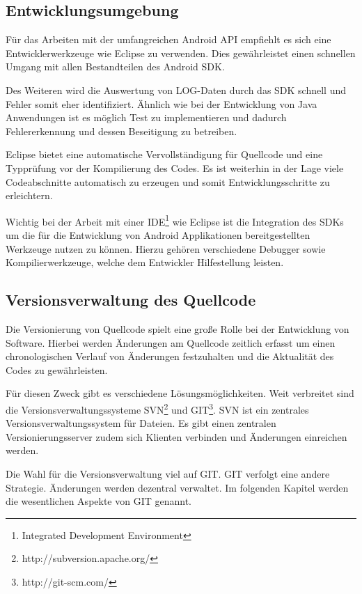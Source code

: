 \subsection{Entwicklungsumgebung}

Für das Arbeiten mit der umfangreichen Android API empfiehlt es sich eine Entwicklerwerkzeuge wie Eclipse zu verwenden. Dies gewährleistet einen schnellen Umgang mit allen Bestandteilen des Android SDK.

Des Weiteren wird die Auswertung von LOG-Daten durch das SDK schnell und Fehler somit eher identifiziert. Ähnlich wie bei der Entwicklung von Java Anwendungen ist es möglich Test zu implementieren und dadurch Fehlererkennung und dessen Beseitigung zu betreiben.

Eclipse bietet eine automatische Vervollständigung für Quellcode und eine Typprüfung vor der Kompilierung des Codes. Es ist weiterhin in der Lage viele Codeabschnitte automatisch zu erzeugen und somit Entwicklungsschritte zu erleichtern.

Wichtig bei der Arbeit mit einer IDE\footnote{Integrated Development Environment} wie Eclipse ist die Integration des SDKs um die für die Entwicklung von Android Applikationen bereitgestellten Werkzeuge nutzen zu können. Hierzu gehören verschiedene Debugger sowie Kompilierwerkzeuge, welche dem Entwickler Hilfestellung leisten.

\subsection{Versionsverwaltung des Quellcode}

Die Versionierung von Quellcode spielt eine große Rolle bei der Entwicklung von Software. Hierbei werden Änderungen am Quellcode zeitlich erfasst um einen chronologischen Verlauf von Änderungen festzuhalten und die Aktualität des Codes zu gewährleisten.

Für diesen Zweck gibt es verschiedene Lösungsmöglichkeiten. Weit verbreitet sind die Versionsverwaltungssysteme SVN\footnote{http://subversion.apache.org/} und GIT\footnote{http://git-scm.com/}.
SVN ist ein zentrales Versionsverwaltungssystem für Dateien. Es gibt einen zentralen Versionierungsserver zudem sich Klienten verbinden und Änderungen einreichen werden.

Die Wahl für die Versionsverwaltung viel auf GIT. GIT verfolgt eine andere Strategie. Änderungen werden dezentral verwaltet. Im folgenden Kapitel werden die wesentlichen Aspekte von GIT genannt.


